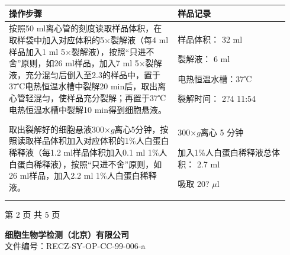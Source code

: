 \documentclass[UTF8,10pt,a4paper,fontset=fandol]{ctexart}
\newcommand{\fieldvalue}[1]{#1}
\newcommand{\handwritten}[1]{#1}
\begin{document}
\begin{tabular}{|p{0.57\linewidth}|p{0.37\linewidth}|}
\hline
\textbf{操作步骤} & \textbf{样品记录} \\ \hline
按照50 ml离心管的刻度读取样品体积，在取样袋中加入对应体积的5$\times$裂解液（每4 ml样品加入1 ml 5$\times$裂解液），按照“只进不舍”原则，如26 ml样品，加入7 ml 5$\times$裂解液，充分混匀后倒入至2.3的样品中，置于37℃电热恒温水槽中裂解20 min后，取出离心管轻混匀，使样品充分裂解；再置于37℃电热恒温水槽中裂解10 min得到细胞悬液。 &
样品体积：
\fieldvalue{\handwritten{32}} ml

裂解液：
\fieldvalue{\handwritten{6}} ml

电热恒温水槽：37℃

裂解时间：
\fieldvalue{\handwritten{2?4}} \quad
\fieldvalue{\handwritten{11:54}}
\\ \hline
取出裂解好的细胞悬液300$\times g$离心5分钟，按照读取样品体积加入对应体积的1\%人白蛋白稀释液（每1.2 ml样品体积加入0.1 ml 1\%人白蛋白稀释液），按照“只进不舍”原则，如26 ml样品，加入2.2 ml 1\%人白蛋白稀释液。 &
\fieldvalue{\handwritten{300}}$\times g$离心
\fieldvalue{\handwritten{5}} 分钟

加入1\%人白蛋白稀释液总体积：
\fieldvalue{\handwritten{2.7}} ml

吸取
\fieldvalue{\handwritten{20?}} $\mu$l
\\ \hline
\end{tabular}

\begin{center}
第 2 页 共 5 页
\end{center}

\newpage

\begin{flushleft}
\textbf{细胞生物学检测（北京）有限公司}\\
文件编号：RECZ-SY-OP-CC-99-006-a
\end{flushleft}
\end{document}
